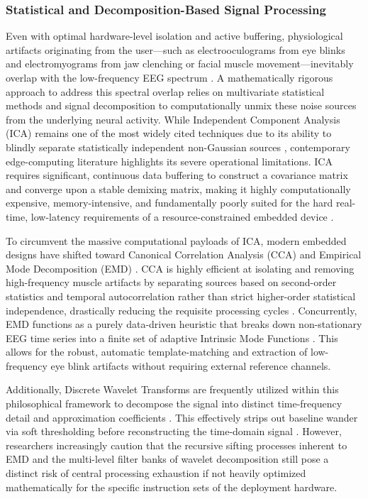 \subsubsection{Statistical and Decomposition-Based Signal Processing}

Even with optimal hardware-level isolation and active buffering, physiological artifacts originating from the user—such as electrooculograms from eye blinks and electromyograms from jaw clenching or facial muscle movement—inevitably overlap with the low-frequency EEG spectrum \cite{agounad2025advanced, yedukondalu2023circulant}. A mathematically rigorous approach to address this spectral overlap relies on multivariate statistical methods and signal decomposition to computationally unmix these noise sources from the underlying neural activity. While Independent Component Analysis (ICA) remains one of the most widely cited techniques due to its ability to blindly separate statistically independent non-Gaussian sources \cite{avital2025optimizing}, contemporary edge-computing literature highlights its severe operational limitations. ICA requires significant, continuous data buffering to construct a covariance matrix and converge upon a stable demixing matrix, making it highly computationally expensive, memory-intensive, and fundamentally poorly suited for the hard real-time, low-latency requirements of a resource-constrained embedded device \cite{ein2023eeg, shahshahani2022fica}.

To circumvent the massive computational payloads of ICA, modern embedded designs have shifted toward Canonical Correlation Analysis (CCA) and Empirical Mode Decomposition (EMD) \cite{trong2024real}. CCA is highly efficient at isolating and removing high-frequency muscle artifacts by separating sources based on second-order statistics and temporal autocorrelation rather than strict higher-order statistical independence, drastically reducing the requisite processing cycles \cite{hossain2022motion, akshath2025hybrid}.  Concurrently, EMD functions as a purely data-driven heuristic that breaks down non-stationary EEG time series into a finite set of adaptive Intrinsic Mode Functions \cite{gorur2023fourier}. This allows for the robust, automatic template-matching and extraction of low-frequency eye blink artifacts without requiring external reference channels.

Additionally, Discrete Wavelet Transforms are frequently utilized within this philosophical framework to decompose the signal into distinct time-frequency detail and approximation coefficients \cite{zangeneh2022eeg}. This effectively strips out baseline wander via soft thresholding before reconstructing the time-domain signal \cite{serbes2024robust}. However, researchers increasingly caution that the recursive sifting processes inherent to EMD and the multi-level filter banks of wavelet decomposition still pose a distinct risk of central processing exhaustion if not heavily optimized mathematically for the specific instruction sets of the deployment hardware\cite{erbsloh2024technical}.

